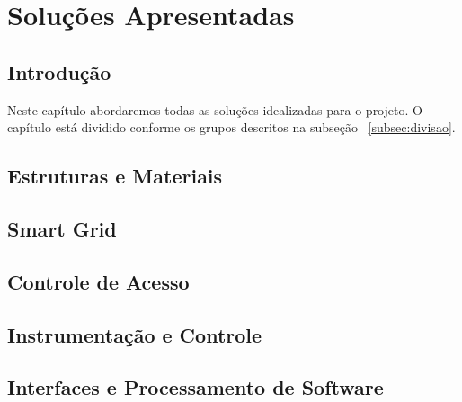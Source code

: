 \part{Soluções Apresentadas}
\chapter[Introdução]{Introdução}
Neste capítulo abordaremos todas as soluções idealizadas para o projeto. O capítulo está dividido conforme os grupos descritos na subseção ~\ref{subsec:divisao}.

\chapter[Estruturas e Materiais]{Estruturas e Materiais}

\chapter[Smart Grid]{Smart Grid}

\chapter[Controle de Acesso]{Controle de Acesso}

\chapter[Instrumentação e Controle]{Instrumentação e Controle}

\chapter[Interfaces e Processamento de Software]{Interfaces e Processamento de Software}
